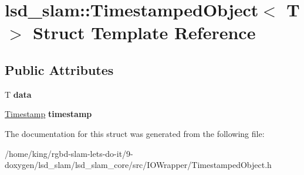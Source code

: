 \hypertarget{structlsd__slam_1_1_timestamped_object}{\section{lsd\-\_\-slam\-:\-:Timestamped\-Object$<$ T $>$ Struct Template Reference}
\label{structlsd__slam_1_1_timestamped_object}
}
\subsection*{Public Attributes}
\begin{DoxyCompactItemize}
\item 
\hypertarget{structlsd__slam_1_1_timestamped_object_a5bbd5ce08c30dca12b45e9155593d352}{T {\bfseries data}}\label{structlsd__slam_1_1_timestamped_object_a5bbd5ce08c30dca12b45e9155593d352}

\item 
\hypertarget{structlsd__slam_1_1_timestamped_object_aad518be99dcabf08ba3561b69b527393}{\hyperlink{classlsd__slam_1_1_timestamp}{Timestamp} {\bfseries timestamp}}\label{structlsd__slam_1_1_timestamped_object_aad518be99dcabf08ba3561b69b527393}

\end{DoxyCompactItemize}


The documentation for this struct was generated from the following file\-:\begin{DoxyCompactItemize}
\item 
/home/king/rgbd-\/slam-\/lets-\/do-\/it/9-\/doxygen/lsd\-\_\-slam/lsd\-\_\-slam\-\_\-core/src/\-I\-O\-Wrapper/Timestamped\-Object.\-h\end{DoxyCompactItemize}
